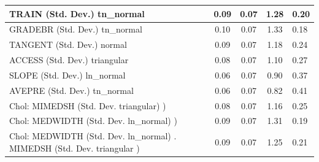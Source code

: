 \begin{table}
\begin{center}
\begin{tabular}{|l|l|c|c|c|l|}
			\hline
			TRAIN (Std. Dev.) tn_normal &  & 0.09 & 0.07 & 1.28 & 0.20 \\
			\hline
			GRADEBR (Std. Dev.) tn_normal &  & 0.10 & 0.07 & 1.33 & 0.18 \\
			\hline
			TANGENT (Std. Dev.) normal &  & 0.09 & 0.07 & 1.18 & 0.24 \\
			\hline
			ACCESS (Std. Dev.) triangular &  & 0.08 & 0.07 & 1.10 & 0.27 \\
			\hline
			SLOPE (Std. Dev.) ln_normal &  & 0.06 & 0.07 & 0.90 & 0.37 \\
			\hline
			AVEPRE (Std. Dev.) tn_normal &  & 0.06 & 0.07 & 0.82 & 0.41 \\
			\hline
			 Chol: MIMEDSH (Std. Dev. triangular) ) &  & 0.08 & 0.07 & 1.16 & 0.25 \\
			\hline
			 Chol: MEDWIDTH (Std. Dev. ln_normal) ) &  & 0.09 & 0.07 & 1.31 & 0.19 \\
			\hline
			 Chol: MEDWIDTH (Std. Dev. ln_normal) . MIMEDSH (Std. Dev.   triangular ) &  & 0.09 & 0.07 & 1.25 & 0.21 \\
			\hline
		\end{tabular}
	\end{center}
\end{table}